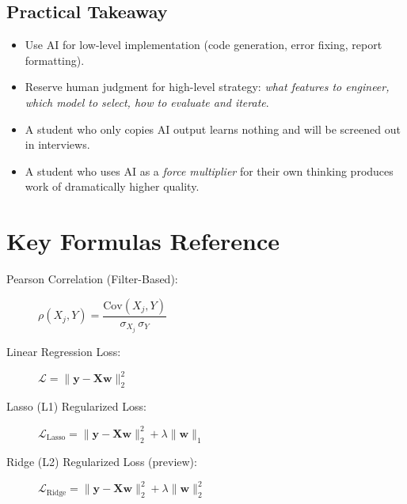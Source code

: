 \documentclass[11pt]{article}
\begin{document}
\subsection{Practical Takeaway}
\begin{itemize}
    \item Use AI for low-level implementation (code generation, error fixing, report formatting).
    \item Reserve human judgment for high-level strategy: \emph{what features to engineer, which model to select, how to evaluate and iterate}.
    \item A student who only copies AI output learns nothing and will be screened out in interviews.
    \item A student who uses AI as a \emph{force multiplier} for their own thinking produces work of dramatically higher quality.
\end{itemize}


\section{Key Formulas Reference}

\begin{description}
    \item[Pearson Correlation (Filter-Based):] \( \rho(X_j, Y) = \dfrac{\text{Cov}(X_j, Y)}{\sigma_{X_j}\,\sigma_Y} \)

    \item[Linear Regression Loss:] \( \mathcal{L} = \|\mathbf{y} - \mathbf{X}\mathbf{w}\|_2^2 \)

    \item[Lasso (L1) Regularized Loss:] \( \mathcal{L}_\text{Lasso} = \|\mathbf{y} - \mathbf{X}\mathbf{w}\|_2^2 + \lambda\|\mathbf{w}\|_1 \)

    \item[Ridge (L2) Regularized Loss (preview):] \( \mathcal{L}_\text{Ridge} = \|\mathbf{y} - \mathbf{X}\mathbf{w}\|_2^2 + \lambda\|\mathbf{w}\|_2^2 \)
\end{description}
\end{document}

